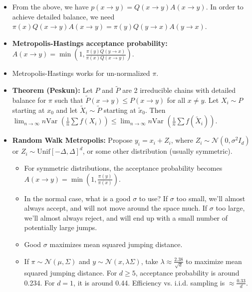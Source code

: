 \documentclass[twoside]{article}
\newcommand{\dis}{\displaystyle}
\newcommand\calN{\mathcal{N}}
\newcommand\Dlt{\Delta}
\newcommand\lmb{\lambda}
\newcommand\sg{\sigma}
\newcommand\Sg{\Sigma}
\newcommand\goesto{\rightarrow}
\newcommand\var{\text{Var }}
\begin{document}
\begin{itemize}
\item From the above, we have $p(x \goesto y) = Q(x \goesto y) A(x \goesto y)$. In order to achieve detailed balance, we need $\pi(x) Q(x \goesto y) A(x \goesto y) = \pi(y) Q(y \goesto x) A(y \goesto x)$.

\item \textbf{Metropolis-Hastings acceptance probability:} $A(x \goesto y) = \min \left(1, \dis\frac{\pi(y)Q(y \goesto x)}{\pi(x) Q(x \goesto y)} \right)$.

\item Metropolis-Hastings works for un-normalized $\pi$.

\item \textbf{Theorem (Peskun):} Let $P$ and $\tilde{P}$ are 2 irreducible chains with detailed balance for $\pi$ such that $\tilde{P}(x \goesto y) \leq P(x \goesto y)$ for all $x \neq y$. Let $X_i \sim P$ starting at $x_0$ and let $\tilde{X}_i \sim \tilde{P}$ starting at $\tilde{x}_0$. Then $\dis\lim_{n \goesto \infty} n \var \left(\frac{1}{n} \sum f(X_i) \right) \leq \dis\lim_{n \goesto \infty} n \var \left(\frac{1}{n} \sum f(\tilde{X}_i) \right)$.

\item \textbf{Random Walk Metropolis:} Propose $y_i = x_i + Z_i$, where $Z_i \sim \calN(0, \sg^2 I_d)$ or $Z_i \sim \text{Unif}[-\Dlt, \Dlt]^d$, or some other distribution (usually symmetric).
\begin{itemize}
\item For symmetric distributions, the acceptance probability becomes $A(x \goesto y) = \min \left(1, \dis\frac{\pi(y)}{\pi(x)} \right)$.

\item In the normal case, what is a good $\sg$ to use? If $\sg$ too small, we'll almost always accept, and will not move around the space much. If $\sg$ too large, we'll almost always reject, and will end up with a small number of potentially large jumps.

\item Good $\sg$ maximizes mean squared jumping distance.

\item If $\pi \sim \calN(\mu, \Sg)$ and $y \sim \calN(x, \lmb\Sg)$, take $\lmb \approx \dis\frac{2.38}{\sqrt{d}}$ to maximize mean squared jumping distance. For $d \geq 5$, acceptance probability is around 0.234. For $d=1$, it is around 0.44. Efficiency vs. i.i.d. sampling is $\approx \dis\frac{0.33}{d}$.
\end{itemize}


\end{itemize}
\end{document}

